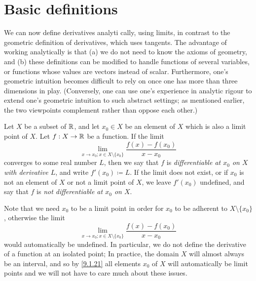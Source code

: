 \section{Basic definitions}\label{sec:10}

\begin{note}
  We can now define derivatives analyti cally, using limits, in contrast to the geometric definition of derivatives, which uses tangents.
  The advantage of working analytically is that
  (a) we do not need to know the axioms of geometry, and
  (b) these definitions can be modified to handle functions of several variables, or functions whose values are vectors instead of scalar.
  Furthermore, one's geometric intuition becomes difficult to rely on once one has more than three dimensions in play.
  (Conversely, one can use one's experience in analytic rigour to extend one's geometric intuition to such abstract settings;
  as mentioned earlier, the two viewpoints complement rather than oppose each other.)
\end{note}

\begin{defn}\label{10.1.1}
  Let \(X\) be a subset of \(\mathbb{R}\), and let \(x_0 \in X\) be an element of \(X\) which is also a limit point of \(X\).
  Let \(f : X \to \mathbb{R}\) be a function.
  If the limit
  \[
    \lim_{x \to x_0 ; x \in X \setminus \{x_0\}} \dfrac{f(x) - f(x_0)}{x - x_0}
  \]
  converges to some real number \(L\), then we say that \(f\) is \emph{differentiable at \(x_0\) on \(X\) with derivative \(L\)}, and write \(f'(x_0) \coloneqq L\).
  If the limit does not exist, or if \(x_0\) is not an element of \(X\) or not a limit point of \(X\), we leave \(f'(x_0)\) undefined, and say that \(f\) is \emph{not differentiable at \(x_0\) on \(X\)}.
\end{defn}

\begin{rmk}\label{10.1.2}
  Note that we need \(x_0\) to be a limit point in order for \(x_0\) to be adherent to \(X \setminus \{x_0\}\), otherwise the limit
  \[
    \lim_{x \to x_0 ; x \in X \setminus \{x_0\}} \dfrac{f(x) - f(x_0)}{x - x_0}
  \]
  would automatically be undefined.
  In particular, we do not define the derivative of a function at an isolated point;
  In practice, the domain \(X\) will almost always be an interval, and so by \cref{9.1.21} all elements \(x_0\) of \(X\) will automatically be limit points and we will not have to care much about these issues.
\end{rmk}

